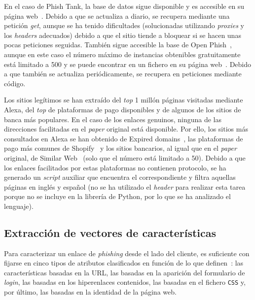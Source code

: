 En el caso de Phish Tank, la base de datos sigue disponible y es accesible en su página web~\cite{phishTankDB}. Debido a que se actualiza a diario, se recupera mediante una petición \textit{get}, aunque se ha tenido dificultades (solucionadas utilizando \textit{proxies} y los \textit{headers} adecuados) debido a que el sitio tiende a bloquear si se hacen unas pocas peticiones seguidas. También sigue accesible la base de Open Phish~\cite{openFishDB}, aunque en este caso el número máximo de instancias obtenibles gratuitamente está limitado a 500 y se puede encontrar en un fichero en su página web~\cite{openFishFile}. Debido a que también se actualiza periódicamente, se recupera en peticiones mediante código.

Los sitios legítimos se han extraído del \textit{top} 1 millón páginas visitadas mediante Alexa, del \textit{top} de plataformas de pago disponibles y de algunos de los sitios de banca más populares. En el caso de los enlaces genuinos, ninguna de las direcciones facilitadas en el \textit{paper} original está disponible. Por ello, los sitios más consultados en Alexa se han obtenido de Expired domains~\cite{AlexaTopWebsites}, las plataformas de pago más comunes de Shopify~\cite{paymentGatewaysWebsites} y los sitios bancarios, al igual que en el \textit{paper} original, de Similar Web~\cite{banksitesTop} (solo que el número está limitado a 50). Debido a que los enlaces facilitados por estas plataformas no contienen protocolo, se ha generado un \textit{script} auxiliar que encuentra el correspondiente y filtra aquellas páginas en inglés y español (no se ha utilizado el \textit{header} para realizar esta tarea porque no se incluye en la librería de Python, por lo que se ha analizado el lenguaje).

\subsection{Extracción de vectores de características}

Para caracterizar un enlace de \textit{phishing} desde el lado del cliente, es suficiente con fijarse en cinco tipos de atributos clasificados en función de lo que definen~\cite{featuresPhishing2018Gupta}: las características basadas en la URL, las basadas en la aparición del formulario de \textit{login}, las  basadas en los hiperenlaces contenidos, las basadas en el fichero \texttt{CSS} y, por último, las basadas en la identidad de la página web.


